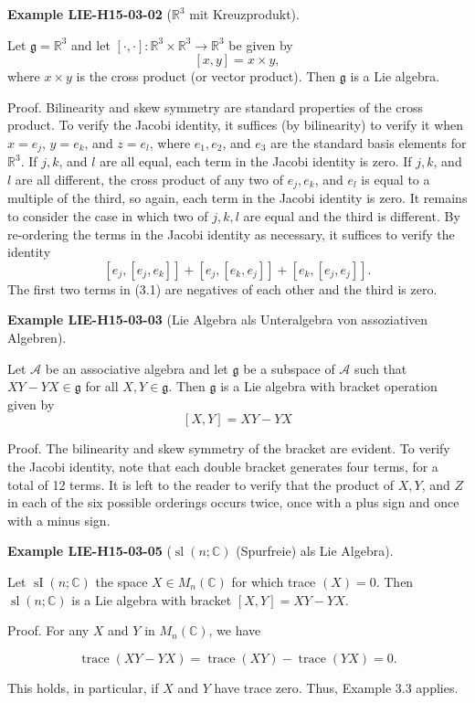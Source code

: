 \documentclass[10pt, letterpaper]{article}
\newcommand{\R}{\mathbb{R}}
\newcommand{\C}{\mathbb{C}}
\newcommand{\CustomHeading}[3]{%
  \par\medskip\noindent%
  \textbf{#1 #2} \textnormal{(#3)}.\enskip%
}
\newenvironment{EXA}[2]{\CustomHeading{Example}{#1}{#2}}{}
\begin{document}
\begin{EXA}{LIE-H15-03-02}{$\R^3$ mit Kreuzprodukt}
Let $\mathfrak{g}=\mathbb{R}^{3}$ and let $[\cdot, \cdot]: \mathbb{R}^{3} \times \mathbb{R}^{3} \rightarrow \mathbb{R}^{3}$ be given by
$$
[x, y]=x \times y,
$$
where $x \times y$ is the cross product (or vector product). Then $\mathfrak{g}$ is a Lie algebra.

Proof. Bilinearity and skew symmetry are standard properties of the cross product. To verify the Jacobi identity, it suffices (by bilinearity) to verify it when $x=e_{j}$, $y=e_{k}$, and $z=e_{l}$, where $e_{1}, e_{2}$, and $e_{3}$ are the standard basis elements for $\mathbb{R}^{3}$. If $j, k$, and $l$ are all equal, each term in the Jacobi identity is zero. If $j, k$, and $l$ are all different, the cross product of any two of $e_{j}, e_{k}$, and $e_{l}$ is equal to a multiple of the third, so again, each term in the Jacobi identity is zero. It remains to consider the case in which two of $j, k, l$ are equal and the third is different. By re-ordering the terms in the Jacobi identity as necessary, it suffices to verify the identity
$$
\left[e_{j},\left[e_{j}, e_{k}\right]\right]+\left[e_{j},\left[e_{k}, e_{j}\right]\right]+\left[e_{k},\left[e_{j}, e_{j}\right]\right] .
$$
The first two terms in (3.1) are negatives of each other and the third is zero.
\end{EXA}

\begin{EXA}{LIE-H15-03-03}{Lie Algebra als Unteralgebra von assoziativen Algebren}
Let $\mathcal{A}$ be an associative algebra and let $\mathfrak{g}$ be a subspace of $\mathcal{A}$ such that $X Y-Y X \in \mathfrak{g}$ for all $X, Y \in \mathfrak{g}$. Then $\mathfrak{g}$ is a Lie algebra with bracket operation given by
$$
[X, Y]=X Y-Y X
$$

Proof. The bilinearity and skew symmetry of the bracket are evident. To verify the Jacobi identity, note that each double bracket generates four terms, for a total of 12 terms. It is left to the reader to verify that the product of $X, Y$, and $Z$ in each of the six possible orderings occurs twice, once with a plus sign and once with a minus sign.
\end{EXA}

\begin{EXA}{LIE-H15-03-05}{$\operatorname{sl}(n;\C)$ (Spurfreie) als Lie Algebra}
Let $\operatorname{sI}(n ; \mathbb{C})$ the space $X \in M_{n}(\mathbb{C})$ for which trace $(X)=0$. Then $\operatorname{sl}(n ; \mathbb{C})$ is a Lie algebra with bracket $[X, Y]=X Y-Y X$.

Proof. For any $X$ and $Y$ in $M_{n}(\mathbb{C})$, we have

$$
\operatorname{trace}(X Y-Y X)=\operatorname{trace}(X Y)-\operatorname{trace}(Y X)=0 .
$$

This holds, in particular, if $X$ and $Y$ have trace zero. Thus, Example 3.3 applies.
\end{EXA}
\end{document}
